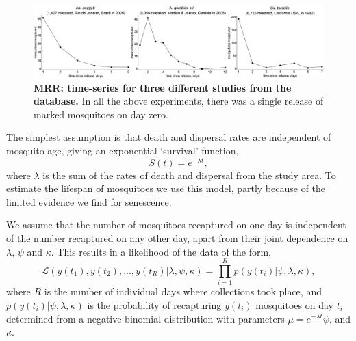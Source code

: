 \documentclass[12pt]{article}
\begin{document}
\begin{figure}[h]
	\centerline{\includegraphics[width=1.25\textwidth]{./Figure_files/mrr_exampleMRRSeries.pdf}}
	\caption{\textbf{MRR: time-series for three different studies from the \cite{guerra2014global} database.} In all the above experiments, there was a single release of marked mosquitoes on day zero.}
	\label{fig:mrr_exampleMRRSeries}
\end{figure}

The simplest assumption is that death and dispersal rates are independent of mosquito age, giving an exponential `survival' function,
%
\begin{equation}
S(t) = e^{-\lambda t},
\end{equation}
%
where $\lambda$ is the sum of the rates of death and dispersal from the study area. To estimate the lifespan of mosquitoes we use this model, partly because of the limited evidence we find for senescence.

We assume that the number of mosquitoes recaptured on one day is independent of the number recaptured on any other day, apart from their joint dependence on $\lambda$, $\psi$ and $\kappa$. This results in a likelihood of the data of the form,
%
\begin{equation}
\mathcal{L}(y(t_1),y(t_2),...,y(t_R)|\lambda,\psi,\kappa) = \prod\limits_{i=1}^{R} p(y(t_i)|\psi,\lambda,\kappa),
\end{equation}
%
where $R$ is the number of individual days where collections took place, and $p(y(t_i)|\psi,\lambda,\kappa)$ is the probability of recapturing $y(t_i)$ mosquitoes on day $t_i$ determined from a negative binomial distribution with parameters $\mu = e^{-\lambda t} \psi$, and $\kappa$.
\end{document}
